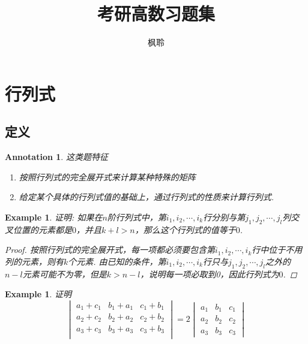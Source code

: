 \documentclass{article}
\newtheorem{example}[theorem]{Example}
\newtheorem{annotation}[theorem]{Annotation}
\begin{document}
\title{考研高数习题集}
\author{枫聆}
\maketitle
\tableofcontents

\section{行列式}

\subsection{定义}

\begin{annotation}
\rm 这类题特征
\begin{enumerate}
	\item 按照行列式的完全展开式来计算某种特殊的矩阵
	\item 给定某个具体的行列式值的基础上，通过行列式的性质来计算行列式. 
\end{enumerate}
\end{annotation}

\begin{example}
\rm 证明: 如果在$n$阶行列式中，第$i_1,i_2,\cdots,i_k$行分别与第$j_1,j_2,\cdots,j_l$列交叉位置的元素都是$0$，并且$k+l > n$，那么这个行列式的值等于$0$.
\begin{proof}
按照行列式的完全展开式，每一项都必须要包含第$i_1,i_2,\cdots,i_k$行中位于不用列的元素，则有$k$个元素. 由已知的条件，第$i_1,i_2,\cdots,i_k$行只与$j_1,j_2,\cdots,j_l$之外的$n-l$元素可能不为零，但是$k > n-l$，说明每一项必取到0，因此行列式为$0$. 
\end{proof}
\end{example}

\begin{example}
\rm 证明
$$
\begin{vmatrix}
a_1 + c_1 &  b_1 + a_1 & c_1+b_1 \\
a_2 + c_2 &  b_2 + a_2 & c_2+b_2 \\
a_3 + c_3 &  b_3 + a_3 & c_3+b_3 \\
\end{vmatrix} = 2 \begin{vmatrix}
a_1 & b_1 & c_1 \\
a_2 & b_2 & c_2 \\
a_3 & b_3 & c_3 	
\end{vmatrix}
$$
\end{example}
\end{document}
